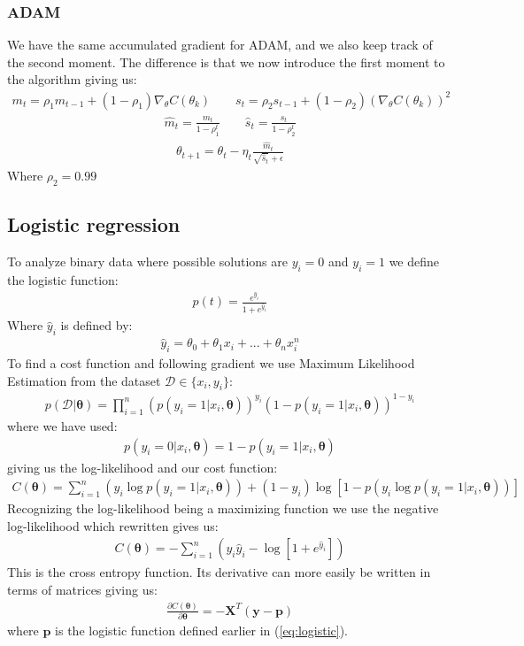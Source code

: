 \documentclass[11pt]{article}
\begin{document}
\subsubsection*{ADAM}
We have the same accumulated gradient for ADAM, and we also keep track of the second moment. The difference is that we now introduce the first moment to the algorithm giving us:
\begin{align*}
    m_t = \rho_1 m_{t-1} + (1-\rho_1)\nabla_\theta C(\theta_k) \quad\quad s_t = \rho_2 s_{t-1} + (1- \rho_2)(\nabla_\theta C(\theta_k))^2
\end{align*}
\begin{align*}
    \hat{m}_t = \frac{m_t }{1-\rho_1^t} \quad\quad \hat{s}_t = \frac{s_t }{1- \rho_2^t}
\end{align*}
\begin{align*}
    \theta_{t+1} = \theta_t - \eta_t \frac{\hat{m}_t}{\sqrt{\hat{s}_t} + \epsilon }
\end{align*}
Where $\rho_2=0.99$
\subsection{Logistic regression}
To analyze binary data where possible solutions are $y_i=0$ and $y_i=1$ we define the logistic function:
\begin{align}
    \label{eq:logistic}
    p(t) =  \frac{e^{\hat{y}_i}}{1+e^{\hat{y}_i}}
\end{align}
Where $\hat{y}_i$ is defined by:
\begin{align*}
    \hat{y}_i = \theta_0 + \theta_1 x_i +...+ \theta_n x_i^n
\end{align*}
To find a cost function and following gradient we use Maximum Likelihood Estimation from the dataset $\mathcal{D} \in \{x_i, y_i\}$:
\begin{align*}
    p(\mathcal{D}|\boldsymbol{\theta}) = \prod_{i=1}^n (p(y_i = 1|x_i,\boldsymbol{\theta}))^{y_i}\left( 1- p(y_i = 1 | x_i, \boldsymbol{\theta})\right)^{1-y_i}
\end{align*}
where we have used:
\begin{align*}
    p(y_i=0|x_i, \boldsymbol{\theta} ) = 1 - p(y_i=1 | x_i, \boldsymbol{\theta})
\end{align*}
giving us the log-likelihood and our cost function:
\begin{align*}
    C(\boldsymbol{\theta}) = \sum_{i=1}^n (y_i \log p(y_i =1 | x_i, \boldsymbol{\theta})) + (1- y_i) \log [1 - p(y_i \log p(y_i =1 | x_i, \boldsymbol{\theta}))]
\end{align*}
Recognizing the log-likelihood being a maximizing function we use the negative log-likelihood which rewritten gives us:
\begin{align}
    \label{eq:cross}
    C(\boldsymbol{\theta}) = -\sum_{i=1}^n (y_i \hat{y}_i - \log [1 + e^{\hat{y}_i}])
\end{align}
This is the cross entropy function.
Its derivative can more easily be written in terms of matrices giving us:
\begin{align*}
    \frac{\partial C(\boldsymbol{\theta})}{\partial \boldsymbol{\theta}} = - \boldsymbol{X}^T (\boldsymbol{y}- \boldsymbol{p})
\end{align*}
where $\boldsymbol{p}$ is the logistic function defined earlier in (\ref{eq:logistic}).
\end{document}

